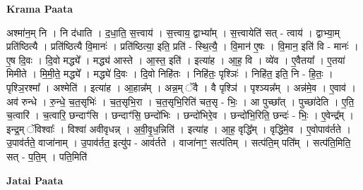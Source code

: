 \documentclass[17pt]{extarticle}
\begin{document}
\textbf{Krama Paata} \newline

अश्मा॑न॒म् नि । नि द॑धाति । द॒धा॒ति॒ स॒त्त्वाय॑ । स॒त्त्वाय॒ द्वाभ्या᳚म् । स॒त्त्वायेति॑ सत् - त्वाय॑ । द्वाभ्या॒म् प्रति॑ष्ठित्यै । प्रति॑ष्ठित्यै वि॒मानः॑ । प्रति॑ष्ठित्या॒ इति॒ प्रति॑ - स्थि॒त्यै॒ । वि॒मान॑ ए॒षः । वि॒मान॒ इति॑ वि - मानः॑ । ए॒ष दि॒वः । दि॒वो मद्ध्ये᳚ । मद्ध्य॑ आस्ते । आ॒स्त॒ इति॑ । इत्या॑ह । आ॒ह॒ वि । व्ये॑व । ए॒वैतया᳚ । ए॒तया॑ मिमीते । मि॒मी॒ते॒ मद्ध्ये᳚ । मद्ध्ये॑ दि॒वः । दि॒वो निहि॑तः । निहि॑तः॒ पृश्ञिः॑ । निहि॑त॒ इति॒ नि - हि॒तः॒ । पृश्ञि॒रश्मा᳚ । अश्मेति॑ । इत्या॑ह । आ॒हान्न᳚म् । अन्न॒म् ॅवै । वै पृश्ञि॑ । पृश्ञ्यन्न᳚म् । अन्न॑मे॒व । ए॒वाव॑ । अव॑ रुन्धे । रु॒न्धे॒ च॒त॒सृभिः॑ । च॒त॒सृभि॒रा । च॒त॒सृभि॒रिति॑ चत॒सृ - भिः॒ । आ पुच्छा᳚त् । पुच्छा॑देति । ए॒ति॒ च॒त्वारि॑ । च॒त्वारि॒ छन्दाꣳ॑सि । छन्दाꣳ॑सि॒ छन्दो॑भिः । छन्दो॑भिरे॒व । छन्दो॑भि॒रिति॒ छन्दः॑ - भिः॒ । ए॒वेन्द्र᳚म् । इन्द्र॒म् ॅविश्वाः᳚ । विश्वा॑ अवीवृधन्न् । अ॒वी॒वृ॒ध॒न्निति॑ । इत्या॑ह । आ॒ह॒ वृद्धि᳚म् । वृद्धि॑मे॒व । ए॒वोपाव॑र्तते । उ॒पाव॑र्तते॒ वाजा॑नाम् । उ॒पाव॑र्तत॒ इत्यु॑प - आव॑र्तते । वाजा॑नाꣳ॒॒ सत्प॑तिम् । सत्प॑ति॒म् पति᳚म् । सत्प॑ति॒मिति॒ सत् - प॒ति॒म् । पति॒मिति॑ \newline

\textbf{Jatai Paata} \newline
\end{document}
